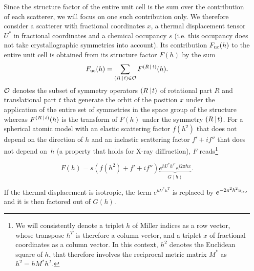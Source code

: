 \documentclass[pdf]{iucr}
\begin{document}
Since the structure factor of the entire unit cell is the sum over the contribution of each scatterer, we will focus on one such contribution only. We therefore consider a scatterer with  fractional coordinates $x$, a thermal displacement tensor $U^*$ in fractional coordinates and a chemical occupancy $s$ (i.e. this occupancy does not take crystallographic symmetries into account).  Its contribution $F_{\text{uc}}(h)$ to the entire unit cell is obtained from its  structure factor $F(h)$  by the sum
\begin{equation}
F_{\text{uc}}(h) = \sum_{\left( R\,\vert\, t \right) \in \cal{O}} F^{\left( R\,\vert\, t \right)}(h).
\end{equation}
$\cal{O}$ denotes the subset of symmetry operators $\left( R\,\vert\, t \right)$ of rotational part $R$ and translational part $t$ that generate the orbit of the position $x$ under the application of the entire set of symmetries in the space group of the structure whereas $F^{\left( R\,\vert\, t \right)}(h)$ is the transform of $F(h)$ under the symmetry $\left( R\,\vert\, t \right)$. For a spherical atomic model with an elastic scattering factor $f(h^2)$ that does not depend on the direction of $h$ and an inelastic scattering factor $f' + if''$ that does not depend on~$h$ (a property that holds for X-ray diffraction), $F$ reads\footnote{We will consistently denote a triplet $h$ of Miller indices as a row vector, whose transpose $h^T$ is therefore a column vector, and a triplet $x$ of fractional coordinates as a column vector. In this context, $h^2$ denotes the Euclidean square of $h$, that therefore involves the reciprocal metric matrix $M^*$ as $h^2 = h M^* h^T$.}

\begin{equation}
F(h) = s (f(h^2) + f' + i f'') \underbrace{e^{h U^* h^T} e^{i 2\pi h x}}_{G(h)}.
\end{equation}

If the thermal displacement is isotropic, the term $e^{h U^* h^T}$ is replaced by $e^{-2\pi^2 h^2 u_{\text{iso}}}$ and it is then factored out of $G(h)$.
\end{document}
